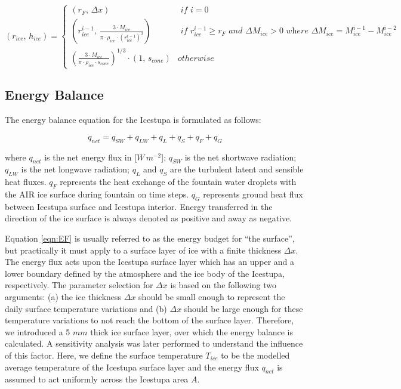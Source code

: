 \documentclass[utf8]{frontiersSCNS} %
\begin{document}
\begin{equation} (r_{ice},\, h_{ice}) = \left\{ \begin{array}{ll} (r_F ,\, \Delta x) & \textit{ if } i=0\\
    (r_{ice}^{i-1},\, \frac{3 \cdot M_{ice}}{\pi \cdot \rho_{ice} \cdot {(r_{ice}^{i-1})}^2}) & \textit{ if }
    r_{ice}^{i-1} \geq r_{F} \textit{ and } \Delta M_{ice} > 0 \textit{ where } \Delta M_{ice} = M_{ice}^{i-1} -
    M_{ice}^{i-2}\\ (\frac{3 \cdot M_{ice}}{\pi \cdot \rho_{ice} \cdot s_{cone}})^{1/3} \cdot (1,\,  s_{cone}) &
otherwise \end{array} \right.  \label{eqn:A2} \end{equation}

\subsection{Energy Balance} \label{section:EB}

The energy balance equation \citep{Hock_2005} for the Icestupa is formulated as follows:

\begin{equation} q_{net} = q_{SW} + q_{LW} + q_{L} + q_{S} + q_{F} + q_{G} \label{eqn:EF} \end{equation}

where $q_{net}$ is the net energy flux in [$W\,m^{-2}$]; $q_{SW}$ is the net shortwave radiation; $q_{LW}$ is the net
longwave radiation; $q_{L}$ and $q_{S}$ are the turbulent latent and sensible heat fluxes. $q_{F}$ represents the heat
exchange of the fountain water droplets with the AIR ice surface during fountain on time steps. $q_{G}$
represents ground heat flux between Icestupa surface and Icestupa interior. Energy transferred in the direction of the
ice surface is always denoted as positive and away as negative.  

Equation \ref{eqn:EF} is usually referred to as the energy budget for “the surface”, but practically it must apply to
a surface layer of ice with a finite thickness $\Delta x$. The energy flux acts upon the Icestupa surface layer which
has an upper and a lower boundary defined by the atmosphere and the ice body of the Icestupa, respectively. The
parameter selection for $\Delta x$ is based on the following two arguments: (a) the ice thickness $\Delta x$ should be
small enough to represent the daily surface temperature variations and (b) $\Delta x$ should be large enough for these
temperature variations to not reach the bottom of the surface layer.  Therefore, we introduced a 5 $mm$ thick ice
surface layer, over which the energy balance is calculated. A sensitivity analysis was later performed to understand
the influence of this factor. Here, we define the surface temperature $T_{ice}$ to be the modelled average temperature
of the Icestupa surface layer and the energy flux $q_{net}$ is assumed to act uniformly across the Icestupa area $A$.
\end{document}
